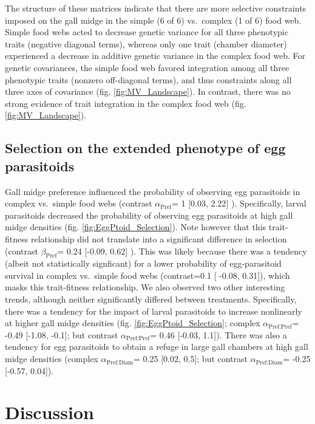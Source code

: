 \documentclass[11pt,]{article}
\begin{document}
The structure of these matrices indicate that there are more selective
constraints imposed on the gall midge in the simple (6 of 6) vs.~complex
(1 of 6) food web. Simple food webs acted to decrease genetic variance
for all three phenotypic traits (negative diagonal terms), whereas only
one trait (chamber diameter) experienced a decrease in additive genetic
variance in the complex food web. For genetic covariances, the simple
food web favored integration among all three phenotypic traits (nonzero
off-diagonal terms), and thus constraints along all three axes of
covariance (fig. \ref{fig:MV_Landscape}). In contrast, there was no
strong evidence of trait integration in the complex food web (fig.
\ref{fig:MV_Landscape}).

\subsection{Selection on the extended phenotype of egg
parasitoids}\label{selection-on-the-extended-phenotype-of-egg-parasitoids}

Gall midge preference influenced the probability of observing egg
parasitoids in complex vs.~simple food webs (contrast
\(\alpha_{\text{Pref}}\)= 1 {[}0.03, 2.22{]} ). Specifically, larval
parasitoids decreased the probability of observing egg parasitoids at
high gall midge densities (fig. \ref{fig:EggPtoid_Selection}). Note
however that this trait-fitness relationship did not translate into a
significant difference in selection (contrast \(\beta_{\text{Pref}}\)=
0.24 {[}-0.09, 0.62{]} ). This was likely because there was a tendency
(albeit not statistically signficant) for a lower probability of
egg-parasitoid survival in complex vs.~simple food webs (contrast=0.1
{[} -0.08, 0.31{]}), which masks this trait-fitness relationship. We
also observed two other interesting trends, although neither
significantly differed between treatments. Specifically, there was a
tendency for the impact of larval parasitoids to increase nonlinearly at
higher gall midge densities (fig. \ref{fig:EggPtoid_Selection}; complex
\(\alpha_{\text{Pref:Pref}}\)= -0.49 {[}-1.08, -0.1{]}; but contrast
\(\alpha_{\text{Pref:Pref}}\)= 0.46 {[}-0.03, 1.1{]}). There was also a
tendency for egg parasitoids to obtain a refuge in large gall chambers
at high gall midge densities (complex \(\alpha_{\text{Pref:Diam}}\)=
0.25 {[}0.02, 0.5{]}; but contrast \(\alpha_{\text{Pref:Diam}}\)= -0.25
{[}-0.57, 0.04{]}).

\section{Discussion}\label{discussion}
\end{document}
